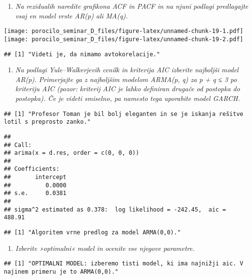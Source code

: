 \documentclass[
]{article}
\providecommand{\tightlist}{%
  \setlength{\itemsep}{0pt}\setlength{\parskip}{0pt}}
\begin{document}
\begin{enumerate}
\def\labelenumi{\arabic{enumi}.}
\setcounter{enumi}{3}
\tightlist
\item
  \emph{Na rezidualih naredite grafikona ACF in PACF in na njuni podlagi
  predlagajte vsaj en model vrste AR(p) ali MA(q).}
\end{enumerate}

\texttt{[image: porocilo\_seminar\_D\_files/figure-latex/unnamed-chunk-19-1.pdf]}
\texttt{[image: porocilo\_seminar\_D\_files/figure-latex/unnamed-chunk-19-2.pdf]}

\begin{verbatim}
## [1] "Videti je, da nimamo avtokorelacije."
\end{verbatim}

\begin{enumerate}
\def\labelenumi{\arabic{enumi}.}
\setcounter{enumi}{4}
\tightlist
\item
  \emph{Na podlagi Yule--Walkerjevih cenilk in kriterija AIC izberite
  najboljši model AR(p). Primerjajte ga z najboljšim modelom ARMA(p, q)
  za p + q ≤ 3 po kriteriju AIC (pozor: kriterij AIC je lahko definiran
  drugače od postopka do postopka). Če je videti smiselno, pa namesto
  tega uporabite model GARCH.}
\end{enumerate}

\begin{verbatim}
## [1] "Profesor Toman je bil bolj eleganten in se je iskanja rešitve lotil s preprosto zanko."
\end{verbatim}

\begin{verbatim}
## 
## Call:
## arima(x = d.res, order = c(0, 0, 0))
## 
## Coefficients:
##       intercept
##          0.0000
## s.e.     0.0381
## 
## sigma^2 estimated as 0.378:  log likelihood = -242.45,  aic = 488.91
\end{verbatim}

\begin{verbatim}
## [1] "Algoritem vrne predlog za model ARMA(0,0)."
\end{verbatim}

\begin{enumerate}
\def\labelenumi{\arabic{enumi}.}
\setcounter{enumi}{5}
\tightlist
\item
  \emph{Izberite »optimalni« model in ocenite vse njegove parametre.}
\end{enumerate}

\begin{verbatim}
## [1] "OPTIMALNI MODEL: izberemo tisti model, ki ima najnižji aic. V najinem primeru je to ARMA(0,0)."
\end{verbatim}
\end{document}
